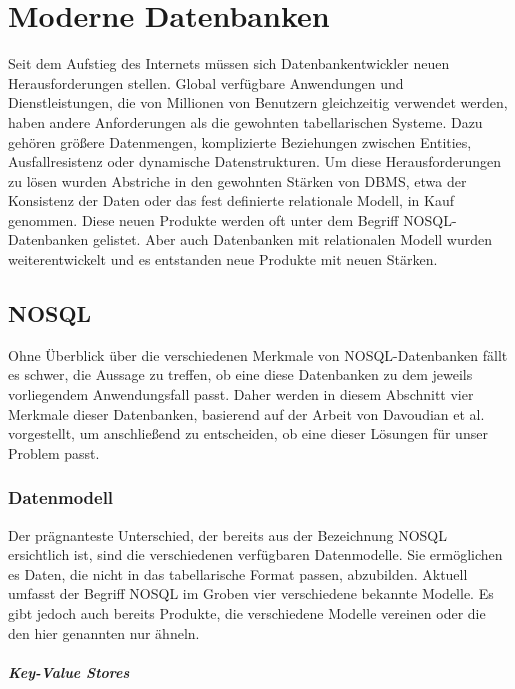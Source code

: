 \chapter{Moderne Datenbanken}

Seit dem Aufstieg des Internets müssen sich Datenbankentwickler neuen Herausforderungen stellen. Global verfügbare Anwendungen und Dienstleistungen, die von Millionen von Benutzern gleichzeitig verwendet werden, haben andere Anforderungen als die gewohnten tabellarischen Systeme. Dazu gehören größere Datenmengen, komplizierte Beziehungen zwischen Entities, Ausfallresistenz oder dynamische Datenstrukturen. Um diese Herausforderungen zu lösen wurden Abstriche in den gewohnten Stärken von \ac{DBMS}, etwa der Konsistenz der Daten oder das fest definierte relationale Modell, in Kauf genommen. Diese neuen Produkte werden oft unter dem Begriff \ac{NOSQL}-Datenbanken gelistet. Aber auch Datenbanken mit relationalen Modell wurden weiterentwickelt und es entstanden neue Produkte mit neuen Stärken. 

\section{NOSQL}
Ohne Überblick über die verschiedenen Merkmale von \ac{NOSQL}-Datenbanken fällt es schwer, die Aussage zu treffen, ob eine diese Datenbanken zu dem jeweils vorliegendem Anwendungsfall passt. Daher werden in diesem Abschnitt vier Merkmale dieser Datenbanken, basierend auf der Arbeit von Davoudian et al.\cite{Davoudian.2018} vorgestellt, um anschließend zu entscheiden, ob eine dieser Lösungen für unser Problem passt.

\subsection{Datenmodell}

Der prägnanteste Unterschied, der bereits aus der Bezeichnung NOSQL ersichtlich ist, sind die verschiedenen verfügbaren Datenmodelle. Sie ermöglichen es Daten, die nicht in das tabellarische Format passen, abzubilden. Aktuell umfasst der Begriff NOSQL im Groben vier verschiedene bekannte Modelle. Es gibt jedoch auch bereits Produkte, die verschiedene Modelle vereinen oder die den hier genannten nur ähneln.

\paragraph*{Key-Value Stores}

